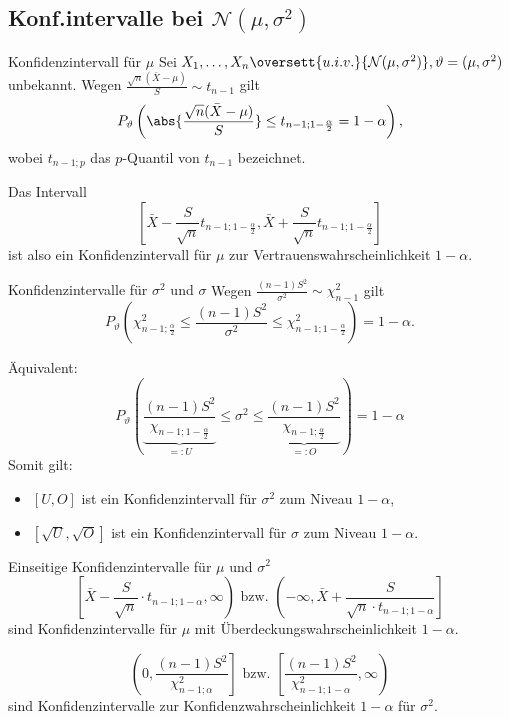 \subsection{Konf.intervalle bei \(\mathcal{N}(\mu, \sigma^2)\)}

\begin{karte}{Konfidenzintervall für \(\mu\)}
Sei \(X_1, \ldots, X_n \oversett{u.i.v.}{\mathcal{N}(\mu, \sigma^2)}, \vartheta = (\mu, \sigma^2) \) unbekannt.
Wegen \(\frac{\sqrt{n}(\bar{X}-\mu)}{S} \sim t_{n-1}\) gilt 
\[ P_\vartheta\left( \abs{\frac{\sqrt{n}(\bar{X}-\mu)}{S}} \leq t_{n-1;1-\frac{\alpha}{2}} = 1-\alpha \right), \]
wobei \(t_{n-1;p}\) das \(p\)-Quantil von \(t_{n-1}\) bezeichnet.

Das Intervall 
\[ [\bar{X} - \frac{S}{\sqrt{n}} t_{n-1;1-\frac{\alpha}{2}}, \bar{X} + \frac{S}{\sqrt{n}} t_{n-1;1-\frac{\alpha}{2}} ] \]
ist also ein Konfidenzintervall für \(\mu\) zur Vertrauenswahrscheinlichkeit \(1-\alpha\).
\end{karte}

\begin{karte}{Konfidenzintervalle für \(\sigma^2\) und \(\sigma\)}
Wegen \( \frac{(n-1)S^2}{\sigma^2} \sim \chi_{n-1}^2 \) gilt 
\[ P_\vartheta\left( \chi_{n-1;\frac{\alpha}{2}}^2 \leq \frac{(n-1)S^2}{\sigma^2} \leq \chi_{n-1;1-\frac{\alpha}{2}}^2 \right) = 1-\alpha. \]

Äquivalent: 
\[ P_\vartheta \left( 
    \underbrace{\frac{(n-1)S^2}{\chi_{n-1;1-\frac{\alpha}{2}}}}_{=: U} 
    \leq \sigma^2 \leq 
    \underbrace{\frac{(n-1)S^2}{\chi_{n-1;\frac{\alpha}{2}}}}_{=: O} \right) 
    = 1-\alpha \]
Somit gilt: 
\begin{itemize}
    \item \([U,O]\) ist ein Konfidenzintervall für \(\sigma^2\) zum Niveau \(1-\alpha\),
    \item \([\sqrt{U}, \sqrt{O}]\) ist ein Konfidenzintervall für \(\sigma\) zum Niveau \(1-\alpha\).
\end{itemize}
\end{karte}

\begin{karte}{Einseitige Konfidenzintervalle für \(\mu\) und \(\sigma^2\)}
\[ \left[ \bar{X} - \frac{S}{\sqrt{n}} \cdot t_{n-1; 1-\alpha}, \infty \right) \text{ bzw. } \left(-\infty, \bar{X} + \frac{S}{\sqrt{n} \cdot t_{n-1;1-\alpha}} \right] \]
sind Konfidenzintervalle für \(\mu\) mit Überdeckungswahrscheinlichkeit \(1-\alpha\).

\[ \left( 0, \frac{(n-1)S^2}{\chi_{n-1;\alpha}^2} \right] \text{ bzw. } \left[ \frac{(n-1)S^2}{\chi_{n-1;1-\alpha}^2}, \infty \right) \]
sind Konfidenzintervalle zur Konfidenzwahrscheinlichkeit \(1-\alpha\) für \(\sigma^2\).
\end{karte}